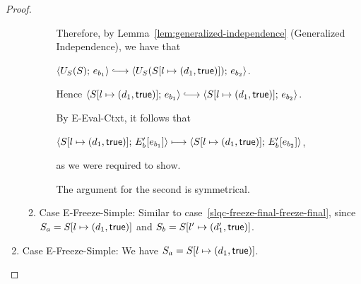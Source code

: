 \begin{proof}
\begin{enumerate}
\begin{enumerate}
\begin{itemize}
        Therefore, by Lemma~\ref{lem:generalized-independence}
        (Generalized Independence), we have that

        $\config{U_S(S)}{e_{b_1}} \parstepsto
        \config{U_S(\extS{S}{l}{d_1}{\frozentrue})}{e_{b_2}}$.

        Hence $\config{\extS{S}{l}{d_1}{\frozentrue}}{e_{b_1}}
        \parstepsto
        \config{\extS{S}{l}{d_1}{\frozentrue}}{e_{b_2}}$.

        By {\sc E-Eval-Ctxt}, it follows that

        $\langle S[l \mapsto (d_1, \textsf{true})];\, E'_b\hspace{-0.5mm}\left[e_{b_1}\right] \rangle
        \longmapsto
        \langle S[l \mapsto (d_1, \textsf{true})];\, E'_b\hspace{-0.5mm}\left[e_{b_2}\right] \rangle$,

        as we were required to show.

        The argument for the second is symmetrical.

      \end{itemize}

    \item \label{slqc-freeze-final-freeze-simple}Case {\sc
      E-Freeze-Simple}: Similar to
      case~\ref{slqc-freeze-final-freeze-final}, since $S_a =
      S[l \mapsto (d_1, \textsf{true})]$ and $S_b =
      S[l' \mapsto (d'_1, \textsf{true})]$.
    \end{enumerate}

  \item Case {\sc E-Freeze-Simple}: We have $S_a =
    S[l \mapsto (d_1, \textsf{true})]$.


\end{enumerate}
\end{proof}
